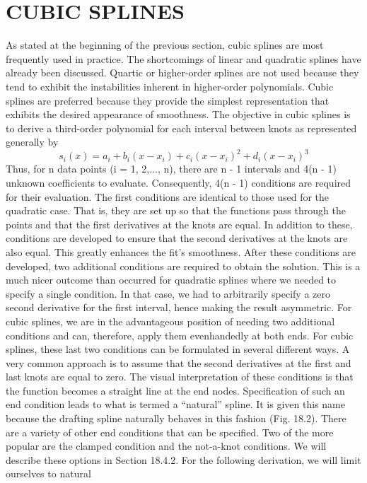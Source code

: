 \documentclass[../main.tex]{subfiles}
\begin{document}
\section{CUBIC SPLINES}
As stated at the beginning of the previous section, cubic splines are most frequently used
in practice. The shortcomings of linear and quadratic splines have already been discussed.
Quartic or higher-order splines are not used because they tend to exhibit the instabilities
inherent in higher-order polynomials. Cubic splines are preferred because they provide the
simplest representation that exhibits the desired appearance of smoothness.
The objective in cubic splines is to derive a third-order polynomial for each interval
between knots as represented generally by
\begin{equation}
    \tag{18.10}
    s_{i}(x)=a_{i}+b_{i}\left(x-x_{i}\right)+c_{i}\left(x-x_{i}\right)^{2}+d_{i}\left(x-x_{i}\right)^{3}
    \end{equation}
    Thus, for n data points (i = 1, 2,..., n), there are n - 1 intervals and 4(n - 1) unknown coefficients to evaluate. Consequently, 4(n - 1) conditions are required for their
    evaluation.
    The first conditions are identical to those used for the quadratic case. That is, they are
    set up so that the functions pass through the points and that the first derivatives at the knots
    are equal. In addition to these, conditions are developed to ensure that the second derivatives at the knots are also equal. This greatly enhances the fit's smoothness.
    After these conditions are developed, two additional conditions are required to obtain
    the solution. This is a much nicer outcome than occurred for quadratic splines where we
    needed to specify a single condition. In that case, we had to arbitrarily specify a zero second derivative for the first interval, hence making the result asymmetric. For cubic splines,
    we are in the advantageous position of needing two additional conditions and can, therefore, apply them evenhandedly at both ends.
    For cubic splines, these last two conditions can be formulated in several different
    ways. A very common approach is to assume that the second derivatives at the first and last
    knots are equal to zero. The visual interpretation of these conditions is that the function becomes a straight line at the end nodes. Specification of such an end condition leads to what
    is termed a “natural” spline. It is given this name because the drafting spline naturally
    behaves in this fashion (Fig. 18.2).
    There are a variety of other end conditions that can be specified. Two of the more popular are the clamped condition and the not-a-knot conditions. We will describe these options in Section 18.4.2. For the following derivation, we will limit ourselves to natural
\end{document}

